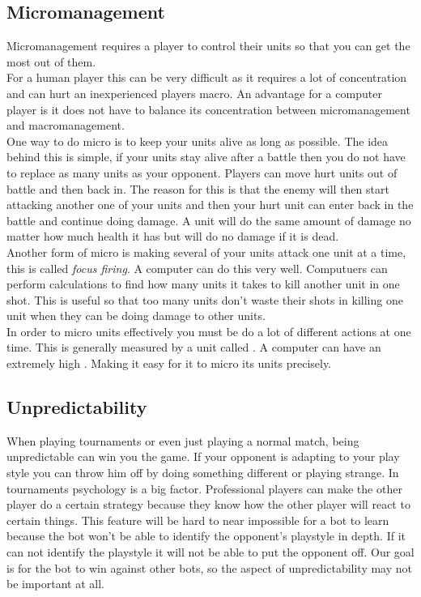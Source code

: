 				
	\subsection{Micromanagement}
		Micromanagement requires a player to control their units so that you can get the most out of them.\\
		
		For a human player this can be very difficult as it requires a lot of concentration and can hurt an inexperienced players macro. 
		An advantage for a computer player is it does not have to balance its concentration between micromanagement and macromanagement.\\
		
		One way to do micro is to keep your units alive as long as possible. 
		The idea behind this is simple, if your units stay alive after a battle then you do not have to replace as many units as your opponent. 
		Players can move hurt units out of battle and then back in. 
		The reason for this is that the enemy will then start attacking another one of your 
		units and then your hurt unit can enter back in the battle and continue doing damage. 
		A unit will do the same amount of damage no matter how much health it has but will do no damage if it is dead.\\
		
		Another form of micro is making several of your units attack one unit at a time, this is called \textit{focus firing}.
		A computer can do this very well. Computuers can perform calculations to find how many units it takes to kill another unit in one shot.
		This is useful so that too many units don't waste their shots in killing one unit when they can be doing damage to other units.\\
		In order to micro units effectively you must be do a lot of different actions at one time. 
		This is generally measured by a unit called \abapm. 
		A computer can have an extremely high \abapm. Making it easy for it to micro its units precisely.
		
	\subsection{Unpredictability}
		When playing tournaments or even just playing a normal match, being unpredictable can win you the game. 
		If your opponent is adapting to your play style you can throw him off by doing something different or playing strange.
		In tournaments psychology is a big factor. Professional players can make the other player do a certain strategy because they know 
		how the other player will react to certain things. This feature will be hard to near impossible for a bot to learn because the bot won't be able to 
		identify the opponent's playstyle in depth. 
		If it can not identify the playstyle it will not be able to put the opponent off. Our goal is for the bot 
		to win against other bots, so the aspect of unpredictability may not be important at all. 
